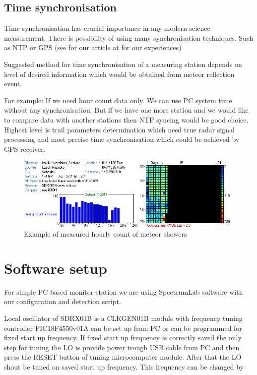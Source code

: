 \documentclass[12pt,a4paper,oneside]{article}
\begin{document}
\subsection{Time synchronisation}

Time synchronisation has crucial importance in any modern science measurement. There is possibility of using many synchronisation techniques. Such as NTP or GPS (see for our article at  for our experiences)

Suggested method for time synchronisation of a measuring station depends on level of desired information which would be obtained from meteor reflection event.    

For example: If we need hour count data only. We can use PC system time without any synchronisation. But if we have one more station and we would like to compare data with another stations then NTP syncing would be good choice.  Highest level is trail parameters determination which need true radar signal processing  and most precise time synchronisation which could be achieved by GPS receiver.

\begin{figure}[htbp]
\begin{center}
\includegraphics [width=150mm] {./img/colorgram.png} 
\end{center}
\caption{Example of measured hourly count of meteor showers}   
\end{figure}

\section{Software setup}

For simple PC based monitor station we are using SpectrumLab software with   our configuration and detection script. 

Local oscillator of SDRX01B is a CLKGEN01B module with frequency tuning controller  PIC18F4550v01A can be set up from PC or can be programmed for fixed start up frequency. If fixed start up frequency is correctly saved the only step for tuning the LO is provide power trough USB cable from PC and then press the RESET button of tuning microcomputer module. After that the LO shout be tuned on saved start up frequency. This frequency can be changed by   
\end{document}
